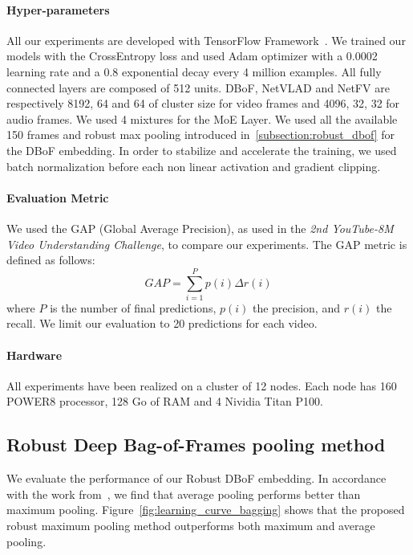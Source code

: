 \documentclass[runningheads]{llncs}
\begin{document}
\paragraph*{\textbf{Hyper-parameters}}
All our experiments are developed with TensorFlow Framework~\cite{tensorflow2015-whitepaper}. We trained our models with the CrossEntropy loss and used Adam optimizer with a 0.0002 learning rate and a 0.8 exponential decay every 4 million examples. All fully connected layers are composed of 512 units. DBoF, NetVLAD and NetFV are respectively 8192, 64 and 64 of cluster size for video frames and 4096, 32, 32 for audio frames. We used 4 mixtures for the MoE Layer. We used all the available 150 frames and robust max pooling introduced in~\ref{subsection:robust_dbof} for the DBoF embedding. In order to stabilize and accelerate the training, we used batch normalization before each non linear activation and gradient clipping. 

\paragraph*{\textbf{Evaluation Metric}}
We used the GAP (Global Average Precision), as used in the \textit{2nd YouTube-8M Video Understanding Challenge}, to compare our experiments. The GAP metric is defined as follows:
\begin{equation*}
	GAP = \sum_{i=1}^{P}p(i) \Delta r(i)
\end{equation*}
where $P$ is the number of final predictions, $p(i)$ the precision, and $r(i)$ the recall. We limit our evaluation to 20 predictions for each video. 

\paragraph*{\textbf{Hardware}}
All experiments have been realized on a cluster of 12 nodes. Each node has 160 POWER8 processor, 128 Go of RAM and 4 Nividia Titan P100.

\subsection{Robust Deep Bag-of-Frames pooling method}
\label{subsection:exp_bagging}
We evaluate the performance of our Robust DBoF embedding. In accordance with the work from~\cite{45619}, we find that average pooling performs better than maximum pooling. 
Figure~\ref{fig:learning_curve_bagging} shows that the proposed robust maximum pooling method outperforms both maximum and average pooling.
\end{document}
